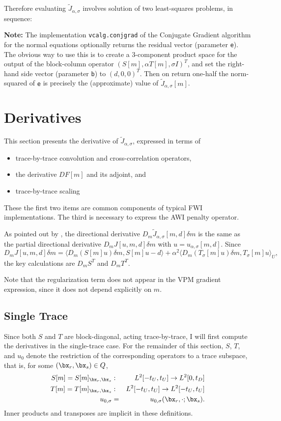 Therefore evaluating $\tilde{J}_{\alpha,\sigma}$ involves solution of two least-squares problems, in sequence:

{\bf Note:} The implementation {\tt vcalg.conjgrad} of the Conjugate Gradient algorithm for the normal equations optionally returns the residual vector (parameter {\tt e}). The obvious way to use this is to create a 3-component product space for the output of the block-column operator $(S[m],\alpha T[m], \sigma I)^T$, and set the right-hand side vector (parameter {\tt b})
to $(d,0,0)^T$. Then on return one-half the norm-squared of {\tt e} is precisely the (approximate) value of $\tilde{J}_{\alpha,\sigma}[m]$.

\section{Derivatives}
This section presents the derivative of $\tilde{J}_{\alpha,\sigma}$, expressed in terms of
\begin{itemize}
  \item trace-by-trace convolution and cross-correlation operators,
  \item the derivative $DF[m]$ and its adjoint, and
  \item trace-by-trace scaling
\end{itemize}
These the first two items are common components of typical FWI implementations. The
third is necessary to express the AWI penalty operator.

As pointed out by \cite{GolubPereyra:73}, the directional derivative $D_m\tilde{J}_{\alpha,\sigma}[m,d]\delta m$ is the same as the partial directional derivative $D_mJ[u,m,d]\delta m$ with $u = u_{\alpha,\sigma}[m,d]$. Since 
\begin{equation}
D_mJ[u,m,d]\delta m = \langle D_m(S[m]u)\delta m, S[m]u-d \rangle + \alpha^2 \langle D_m(T_{\sigma}[m]u)\delta m,T_{\sigma}[m]u\rangle_U,
\label{eqn:basederiv}
\end{equation}
the key calculations are $D_mS^T$ and $D_m T^T$. 

Note that the regularization term does not appear in the VPM gradient expression, since it does not depend explicitly on $m$.

\subsection{Single Trace}

Since both $S$ and $T$ are block-diagonal, acting trace-by-trace, I will first compute the derivatives in the single-trace case. For the remainder of this section, $S$, $T$, and $u_0$ denote the restriction of the corresponding operators to a trace subspace, that is, for some $(\bx_r,\bx_s) \in Q$,
\begin{eqnarray*}
  S[m] = S[m]_{\bx_r,\bx_s}&: & L^2[-t_U,t_U] \rightarrow L^2[0,t_D] \\
  T[m] = T[m]_{\bx_r,\bx_s}&: & L^2[-t_U,t_U] \rightarrow L^2[-t_U,t_U] \\
  u_{0,\sigma} &=& u_{0,\sigma}(\bx_r,\cdot;\bx_s).
\end{eqnarray*}
Inner products and transposes are implicit in these definitions.

